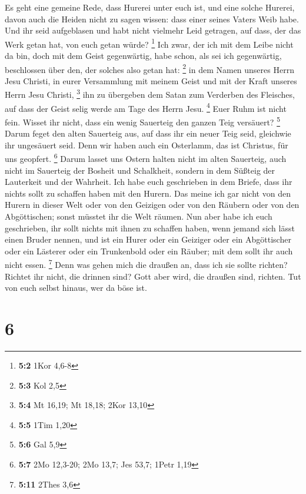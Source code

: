  Es geht eine gemeine Rede, dass Hurerei unter euch ist,
und eine solche Hurerei, davon auch die Heiden nicht zu sagen wissen:
dass einer seines Vaters Weib habe.  Und ihr seid
aufgeblasen und habt nicht vielmehr Leid getragen, auf dass, der das
Werk getan hat, von euch getan würde? \footnote{\textbf{5:2} 1Kor 4,6-8}
 Ich zwar, der ich mit dem Leibe nicht da bin, doch mit
dem Geist gegenwärtig, habe schon, als sei ich gegenwärtig, beschlossen
über den, der solches also getan hat: \footnote{\textbf{5:3} Kol 2,5}
 in dem Namen unseres Herrn Jesu Christi, in eurer
Versammlung mit meinem Geist und mit der Kraft unseres Herrn Jesu
Christi, \footnote{\textbf{5:4} Mt 16,19; Mt 18,18; 2Kor 13,10}
 ihn zu übergeben dem Satan zum Verderben des Fleisches,
auf dass der Geist selig werde am Tage des Herrn Jesu. \footnote{\textbf{5:5}
  1Tim 1,20}  Euer Ruhm ist nicht fein. Wisset ihr nicht,
dass ein wenig Sauerteig den ganzen Teig versäuert? \footnote{\textbf{5:6}
  Gal 5,9}  Darum feget den alten Sauerteig aus, auf dass
ihr ein neuer Teig seid, gleichwie ihr ungesäuert seid. Denn wir haben
auch ein Osterlamm, das ist Christus, für uns geopfert. \footnote{\textbf{5:7}
  2Mo 12,3-20; 2Mo 13,7; Jes 53,7; 1Petr 1,19}  Darum
lasset uns Ostern halten nicht im alten Sauerteig, auch nicht im
Sauerteig der Bosheit und Schalkheit, sondern in dem Süßteig der
Lauterkeit und der Wahrheit.  Ich habe euch geschrieben in
dem Briefe, dass ihr nichts sollt zu schaffen haben mit den Hurern.
 Das meine ich gar nicht von den Hurern in dieser Welt
oder von den Geizigen oder von den Räubern oder von den Abgöttischen;
sonst müsstet ihr die Welt räumen.  Nun aber habe ich
euch geschrieben, ihr sollt nichts mit ihnen zu schaffen haben, wenn
jemand sich lässt einen Bruder nennen, und ist ein Hurer oder ein
Geiziger oder ein Abgöttischer oder ein Lästerer oder ein Trunkenbold
oder ein Räuber; mit dem sollt ihr auch nicht essen. \footnote{\textbf{5:11}
  2Thes 3,6}  Denn was gehen mich die draußen an, dass
ich sie sollte richten? Richtet ihr nicht, die drinnen sind?
 Gott aber wird, die draußen sind, richten. Tut von euch
selbst hinaus, wer da böse ist.

\hypertarget{section-5}{%
\section{6}\label{section-5}}

